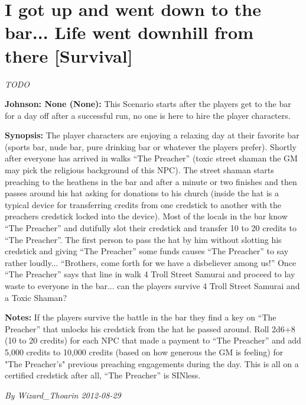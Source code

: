 \documentclass[letterpaper,twocolumn,10.5pt]{article}
\newenvironment{scenario}[6]
	{
		\section{#1 {\small[#2]}}
		\textit{#3}
		\def\TMPSCENARIO{#4 #5}
	}
	{\small\textit{By \TMPSCENARIO}}
\newcommand{\johnson}[2]{\textbf{Johnson: #1 (#2):}}
\newcommand{\synopsis}{\textbf{Synopsis: }}
\newcommand{\notes}{\textbf{Notes: }}
\begin{document}
\begin{scenario}{I got up and went down to the bar... Life went downhill from there}
	{Survival}
	{TODO}
	{Wizard\_Thoarin}
	{2012-08-29}
	{https://forum.rpg.net/showthread.php?321504-Shadowrun-4th-101-Instant-Scenarios\&p=15839610#post15839610}

\johnson{None}{None} This Scenario starts after the players get to the bar for a day off after a successful run, no one is here to hire the player characters.

\synopsis  The player characters are enjoying a relaxing day at their favorite bar (sports bar, nude bar, pure drinking bar or whatever the players prefer). Shortly after everyone has arrived in walks ``The Preacher'' (toxic street shaman the GM may pick the religious background of this NPC). The street shaman starts preaching to the heathens in the bar and after a minute or two finishes and then passes around his hat asking for donations to his church (inside the hat is a typical device for transferring credits from one credstick to another with the preachers credstick locked into the device). Most of the locals in the bar know ``The Preacher'' and dutifully slot their credstick and transfer 10 to 20 credits to ``The Preacher''. The first person to pass the hat by him without slotting his credstick and giving ``The Preacher'' some funds causes ``The Preacher'' to say rather loudly... ``Brothers, come forth for we have a disbeliever among us!'' Once ``The Preacher'' says that line in walk 4 Troll Street Samurai and proceed to lay waste to everyone in the bar... can the players survive 4 Troll Street Samurai and a Toxic Shaman?

\notes  If the players survive the battle in the bar they find a key on ``The Preacher'' that unlocks his credstick from the hat he passed around. Roll 2d6+8 (10 to 20 credits) for each NPC that made a payment to ``The Preacher'' and add 5,000 credits to 10,000 credits (based on how generous the GM is feeling) for "The Preacher's" previous preaching engagements during the day. This is all on a certified credstick after all, ``The Preacher'' is SINless. 

\end{scenario}
\end{document}
